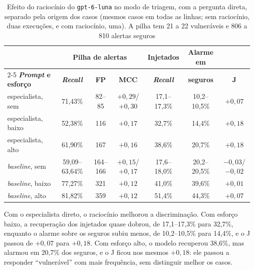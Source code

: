 \begin{table}[htpb]
    \centering
    \caption[Efeito do raciocínio do modelo comercial na triagem]{Efeito do raciocínio do \texttt{gpt-6-luna} no modo de triagem, com a pergunta direta, separado pela origem dos casos (mesmos casos em todas as linhas; sem raciocínio, duas execuções, e com raciocínio, uma). A pilha tem 21 a 22 vulneráveis e 806 a 810 alertas seguros}
    \label{tab:raciocinio}
    \renewcommand{\arraystretch}{1.4}
    \setlength{\tabcolsep}{3.5pt}
    \footnotesize
    \begin{tabular}{|l|c|c|c|c|c|c|}
        \hline
         & \multicolumn{3}{c|}{\textbf{Pilha de alertas}} & \textbf{Injetados} & \textbf{Alarme em} & \\
        \cline{2-5}
        \textbf{\textit{Prompt} e esforço} & \textbf{\textit{Recall}} & \textbf{FP} & \textbf{MCC} & \textbf{\textit{Recall}} & \textbf{seguros} & \textbf{J} \\
        \hline
        especialista, sem & 71,43\% & 82--85 & $+0{,}29$/$+0{,}30$ & 17,1--17,3\% & 10,2--10,5\% & $+0{,}07$ \\
        \hline
        especialista, baixo & 52,38\% & 116 & $+0{,}17$ & 32,7\% & 14,4\% & $+0{,}18$ \\
        \hline
        especialista, alto & 61,90\% & 167 & $+0{,}16$ & 38,6\% & 20,7\% & $+0{,}18$ \\
        \hline
        \textit{baseline}, sem & 59,09--63,64\% & 164--166 & $+0{,}15$/$+0{,}17$ & 17,6--18,0\% & 20,2--20,5\% & $-0{,}03$/$-0{,}02$ \\
        \hline
        \textit{baseline}, baixo & 77,27\% & 321 & $+0{,}12$ & 41,0\% & 39,6\% & $+0{,}01$ \\
        \hline
        \textit{baseline}, alto & 81,82\% & 359 & $+0{,}12$ & 51,4\% & 44,3\% & $+0{,}07$ \\
        \hline
    \end{tabular}
    \par{}
    \fontepesquisa
\end{table}

Com o especialista direto, o raciocínio melhorou a discriminação. Com esforço baixo, a recuperação dos injetados quase dobrou, de 17,1--17,3\% para 32,7\%, enquanto o alarme sobre os seguros subiu menos, de 10,2--10,5\% para 14,4\%, e o J passou de $+0{,}07$ para $+0{,}18$. Com esforço alto, o modelo recuperou 38,6\%, mas alarmou em 20,7\% dos seguros, e o J ficou nos mesmos $+0{,}18$: ele passou a responder ``vulnerável'' com mais frequência, sem distinguir melhor os casos.

